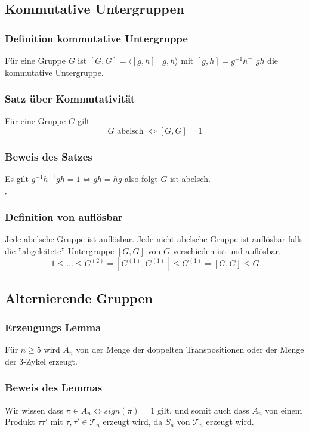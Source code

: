 \documentclass[12pt, german]{article}
\newcommand{\bewiesen}{
	
	\begin{flushright}
		$\square$  \\
\end{flushright}}
\begin{document}
	\subsection{Kommutative Untergruppen}
	\subsubsection{Definition kommutative Untergruppe}
	Für eine Gruppe $G$ ist $[G, G] = \langle [g, h] \mid g, h \rangle$ mit $[g, h] = g^{-1}h^{-1}gh$ die kommutative Untergruppe. 
	
	\subsubsection{Satz über Kommutativität}
	Für eine Gruppe $G$ gilt $$ G \text{ abelsch } \iff [G, G] = 1$$
	
	\subsubsection{Beweis des Satzes}
	Es gilt $g^{-1}h^{-1}gh = 1 \iff gh = hg$ also folgt $G$ ist abelsch. 
	\bewiesen
	
	\subsubsection{Definition von auflösbar}
	Jede abelsche Gruppe ist auflösbar. Jede nicht abelsche Gruppe ist auflösbar falls die ''abgeleitete'' Untergruppe $[G, G]$ von $G$ verschieden ist und auflösbar. 
	\begin{equation*}
		1 \leq \ldots \leq G^{(2)} = [G^{(1)}, G^{(1)} ] \leq G^{(1)} = [G, G ] \leq G  
	\end{equation*}
	
	\subsection{Alternierende Gruppen}
	\subsubsection{Erzeugungs Lemma}
	Für $n \geq 5$ wird $A_n$ von der Menge der doppelten Transpositionen oder der Menge der $3$-Zykel erzeugt.
	
	\subsubsection{Beweis des Lemmas}
	Wir wissen dass $\pi \in A_n \iff sign(\pi) = 1$ gilt, und somit auch dass $A_n$ von einem Produkt $\tau \tau'$ mit $\tau, \tau' \in \mathcal T_n$ erzeugt wird, 
	da $S_n$ von $\mathcal T_n$ erzeugt wird. 
	\newline 
	
\end{document}
